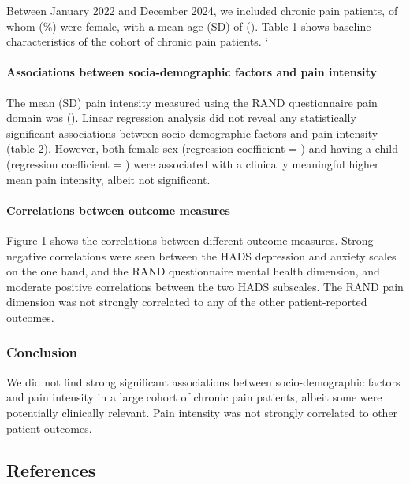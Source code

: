 \documentclass[
]{article}
\begin{document}
Between January 2022 and December 2024, we included chronic pain
patients, of whom (\%) were female, with a mean age (SD) of (). Table 1
shows baseline characteristics of the cohort of chronic pain patients. `

\paragraph{Associations between socia-demographic factors and pain
intensity}\label{associations-between-socia-demographic-factors-and-pain-intensity}

The mean (SD) pain intensity measured using the RAND questionnaire pain
domain was (). Linear regression analysis did not reveal any
statistically significant associations between socio-demographic factors
and pain intensity (table 2). However, both female sex (regression
coefficient = ) and having a child (regression coefficient = ) were
associated with a clinically meaningful higher mean pain intensity,
albeit not significant.

\paragraph{Correlations between outcome
measures}\label{correlations-between-outcome-measures}

Figure 1 shows the correlations between different outcome measures.
Strong negative correlations were seen between the HADS depression and
anxiety scales on the one hand, and the RAND questionnaire mental health
dimension, and moderate positive correlations between the two HADS
subscales. The RAND pain dimension was not strongly correlated to any of
the other patient-reported outcomes.

\subsubsection{Conclusion}\label{conclusion}

We did not find strong significant associations between
socio-demographic factors and pain intensity in a large cohort of
chronic pain patients, albeit some were potentially clinically relevant.
Pain intensity was not strongly correlated to other patient outcomes.

\subsection{References}\label{references}
\end{document}
